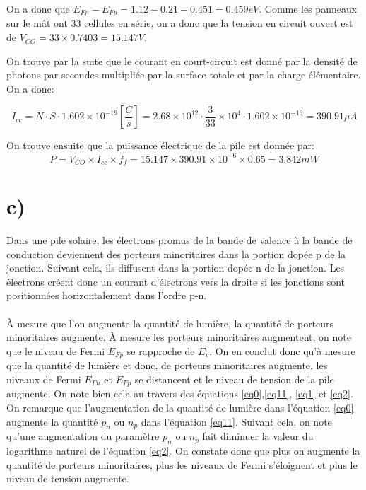 On a donc que $E_{Fn} - E_{Fp} = 1.12 - 0.21 - 0.451 = 0.459eV$. Comme les panneaux sur le mât ont 33 cellules en série, on a donc que la tension en circuit ouvert est de $V_{CO} = 33\times 0.7403 = 15.147 V$.

On trouve par la suite que le courant en court-circuit est donné par la densité de photons par secondes multipliée par la surface totale et par la charge élémentaire. On a donc: 

\begin{equation}
I_{cc} = N\cdot S \cdot 1.602\times 10^{-19} \left[\frac{C}{s}\right] = 2.68 \times 10^{12} \cdot \frac{3}{33}\times 10^4 \cdot  1.602\times 10^{-19} = 390.91\mu A
\end{equation}

On trouve ensuite que la puissance électrique de la pile est donnée par:
\begin{equation}
P = V_{CO} \times I_{cc} \times f_f =  15.147 \times 390.91\times 10^{-6}\times 0.65 = 3.842mW
\end{equation}

\section{c)}
Dans une pile solaire, les électrons promus de la bande de valence à la bande de conduction deviennent des porteurs minoritaires dans la portion dopée p de la jonction. Suivant cela, ils diffusent dans la portion dopée n de la jonction. Les électrons créent donc un courant d'électrons vers la droite si les jonctions sont positionnées horizontalement dans l'ordre p-n.

\paragraph{} À mesure que l'on augmente la quantité de lumière, la quantité de porteurs minoritaires augmente. À mesure les porteurs minoritaires augmentent, on note que le niveau de Fermi $E_{Fp}$ se rapproche de $E_v$. On en conclut donc qu'à mesure que la quantité de lumière et donc, de porteurs minoritaires augmente, les niveaux de Fermi $E_{Fn}$ et $E_{Fp}$ se distancent et le niveau de tension de la pile augmente. On note bien cela au travers des équations \ref{eq0},\ref{eq11}, \ref{eq1} et \ref{eq2}. On remarque que l'augmentation de la quantité de lumière dans l'équation \ref{eq0} augmente la quantité $p_n$ ou $n_p$ dans l'équation \ref{eq11}. Suivant cela, on note qu'une augmentation du paramètre $p_n$ ou $n_p$ fait diminuer la valeur du logarithme naturel de l'équation \ref{eq2}. On constate donc que plus on augmente la quantité de porteurs minoritaires, plus les niveaux de Fermi s'éloignent et plus le niveau de tension augmente.

